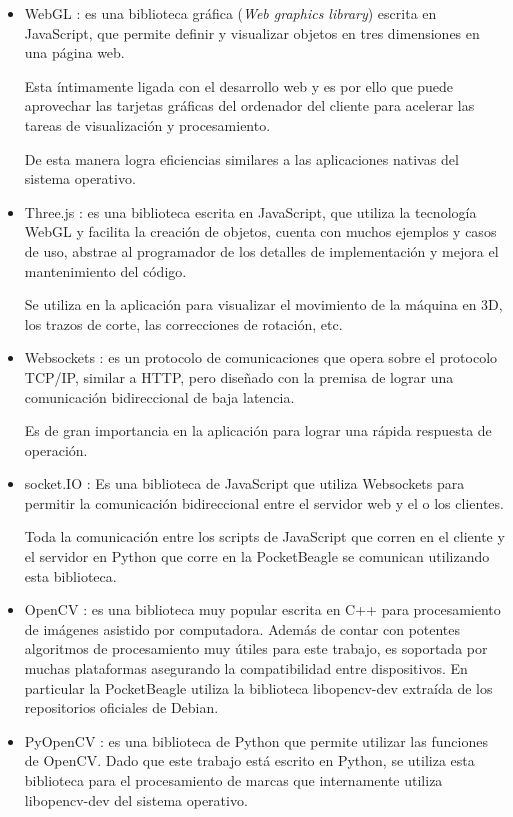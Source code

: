\begin{itemize}
{         También se utilizan bibliotecas de terceros para diferentes usos, escritas en este lenguaje, lo que permite reutilizar código.
      }
      \item{WebGL \citep{WEBSITE:webgl}: es una biblioteca gráfica (\textit{Web graphics library}) escrita en JavaScript, que permite definir y visualizar objetos en tres dimensiones en una página web.\par
         Esta íntimamente ligada con el desarrollo web y es por ello que puede aprovechar las tarjetas gráficas del ordenador del cliente para acelerar las tareas de visualización y procesamiento.\par
         De esta manera logra eficiencias similares a las aplicaciones nativas del sistema operativo.
      }
      \item{Three.js \citep{WEBSITE:threejs}: es una biblioteca escrita en JavaScript, que utiliza la tecnología WebGL y facilita la creación de objetos, cuenta con muchos ejemplos y casos de uso, abstrae al programador de los detalles de implementación y mejora el mantenimiento del código.\par
         Se utiliza en la aplicación para visualizar el movimiento de la máquina en 3D, los trazos de corte, las correcciones de rotación, etc.
      }
      \item{Websockets \citep{WEBSITE:websockets}: es un protocolo de comunicaciones que opera sobre el protocolo TCP/IP, similar a HTTP, pero diseñado con la premisa de lograr una comunicación bidireccional de baja latencia.\par
         Es de gran importancia en la aplicación para lograr una rápida respuesta de operación.
      }
      \item{socket.IO \citep{WEBSITE:socketio}: Es una biblioteca de JavaScript que utiliza Websockets para permitir la comunicación bidireccional entre el servidor web y el o los clientes.\par
         Toda la comunicación entre los scripts de JavaScript que corren en el cliente y el servidor en Python que corre en la PocketBeagle se comunican utilizando esta biblioteca.
      }
      \item{OpenCV \citep{WEBSITE:opencv}: es una biblioteca muy popular escrita en C++ para procesamiento de imágenes asistido por computadora.
      Además de contar con potentes algoritmos de procesamiento muy útiles para este trabajo, es soportada por muchas plataformas asegurando la compatibilidad entre dispositivos.
      En particular la PocketBeagle utiliza la biblioteca libopencv-dev extraída de los repositorios oficiales de Debian.
      }
      \item{PyOpenCV \citep{WEBSITE:pyopencv}: es una biblioteca de Python que permite utilizar las funciones de OpenCV.
      Dado que este trabajo está escrito en Python, se utiliza esta biblioteca para el procesamiento de marcas que internamente utiliza libopencv-dev del sistema operativo.
      }
   \end{itemize}

